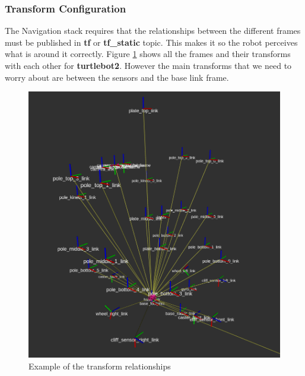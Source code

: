 \subsubsection{Transform Configuration}
The Navigation stack requires that the relationships between the different frames must be published in \textbf{tf} or \textbf{tf\_static} topic. This makes it so the robot perceives what is around it correctly.
Figure \ref{fig:tf} shows all the frames and their transforms with each other for \textbf{turtlebot2}. However the main transforms that we need to worry about are between the sensors and the base link frame.
\begin{figure}[!htb]
    \centering
    \includegraphics[scale=0.3]{imgs/chapter3/tf.png}
    \caption{Example of the transform relationships}
    \label{fig:tf}
\end{figure}

